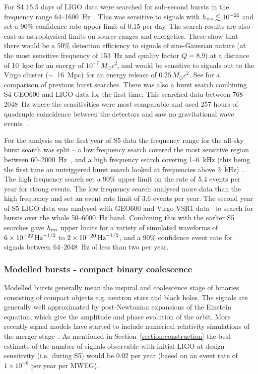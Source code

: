\documentclass{article}
\begin{document}
For S4 15.5 days of LIGO data were searched for sub-second bursts in the
frequency range 64--1600~Hz~\cite{Abbott:2007b}. This was sensitive to signals
with $h_{\rm rss}\lesssim10^{-20}$ and set a 90\% confidence rate upper limit of
0.15 per day. The search results are also cast as astrophysical limits on source
ranges and energetics. These show that there would be a 50\% detection
efficiency to signals of sine-Gaussian nature (at the most sensitive frequency
of 153~Hz and quality factor $Q=8.9$) at a distance of 10~kpc for an energy of
$10^{-7}\,M_{\odot}c^2$, and would be sensitive to signals out to the Virgo
cluster ($\sim$~16~Mpc) for an energy release of $0.25\,M_{\odot}c^2$. See
\cite{Abbott:2007b} for a comparison of previous burst searches. There was also
a burst search combining S4 GEO600 and LIGO data for the first time. This
searched data between 768--2048~Hz where the sensitivities were most comparable
and used 257 hours of quadruple coincidence between the detectors and saw no
gravitational wave events~\cite{Abbott:2008b}.

For the analysis on the first year of S5 data the frequency range for the
all-sky burst search was split -- a low frequency search covered the most
sensitive region between 60--2000~Hz~\cite{Abbott:2009h}, and a high frequency
search covering 1--6~kHz (this being the first time an untriggered burst search
looked at frequencies above 3~kHz)~\cite{Abbott:2009i}. The high frequency
search set a 90\% upper limit on the rate of 5.4 events per year for strong
events. The low frequency search analysed more data than the high frequency and
set an event rate limit of 3.6 events per year. The second year of S5 LIGO data
was analysed with GEO600 and Virgo VSR1 data~\cite{Abadie:2010d} to search for
bursts over the whole 50--6000~Hz band. Combining this with the earlier S5
searches gave $h_{\rm rss}$ upper limits for a variety of simulated waveforms of
$6\times10^{-22}\,{\rm Hz}^{-1/2}$ to $2\times10^{-20}\,{\rm Hz}^{-1/2}$, and a
90\% confidence event rate for signals between 64--2048~Hz of less than two per
year.

\subsubsection{Modelled bursts - compact binary coalescence}
\label{sec:cbc}

Modelled bursts generally mean the inspiral and coalescence stage of binaries
consisting of compact objects e.g. neutron stars and black holes. The signals
are generally well approximated by post-Newtonian expansions of the Einstein
equation, which give the amplitude and phase evolution of the orbit. More
recently signal models have started to include numerical relativity simulations
of the merger stage~\cite{Aylott:2009}. As mentioned in
Section~\ref{section:construction} the best estimate of the number of signals
observable with initial LIGO at design sensitivity (i.e.\ during S5) would be
0.02 per year (based on an event rate of $1\times10^{-6}$ per year per MWEG).
\end{document}
